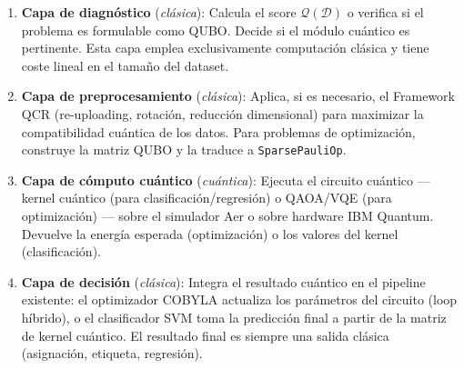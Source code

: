 \begin{enumerate}
  \item \textbf{Capa de diagnóstico} (\textit{clásica}): Calcula el score $\mathcal{Q}(\mathcal{D})$ o verifica si el problema es formulable como QUBO. Decide si el módulo cuántico es pertinente. Esta capa emplea exclusivamente computación clásica y tiene coste lineal en el tamaño del dataset.

  \item \textbf{Capa de preprocesamiento} (\textit{clásica}): Aplica, si es necesario, el Framework QCR (re-uploading, rotación, reducción dimensional) para maximizar la compatibilidad cuántica de los datos. Para problemas de optimización, construye la matriz QUBO y la traduce a \texttt{SparsePauliOp}.

  \item \textbf{Capa de cómputo cuántico} (\textit{cuántica}): Ejecuta el circuito cuántico — kernel cuántico (para clasificación/regresión) o QAOA/VQE (para optimización) — sobre el simulador Aer o sobre hardware IBM Quantum. Devuelve la energía esperada (optimización) o los valores del kernel (clasificación).

  \item \textbf{Capa de decisión} (\textit{clásica}): Integra el resultado cuántico en el pipeline existente: el optimizador COBYLA actualiza los parámetros del circuito (loop híbrido), o el clasificador SVM toma la predicción final a partir de la matriz de kernel cuántico. El resultado final es siempre una salida clásica (asignación, etiqueta, regresión).
\end{enumerate}

